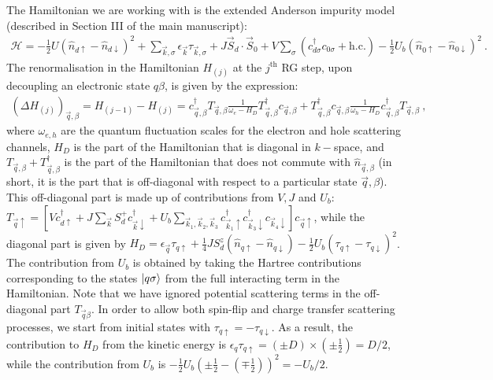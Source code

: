\documentclass{iopart}
\begin{document}
The Hamiltonian we are working with is the extended Anderson impurity model (described in Section III of the main manuscript):
\begin{eqnarray}
	\mathcal{H} = -\frac{1}{2}U \left(\hat n_{d \uparrow} - \hat n_{d \downarrow}\right)^2 + \sum_{\vec k,\sigma} \epsilon_{\vec k} \tau_{\vec k,\sigma} + J \vec{S}_d\cdot\vec{S}_0 + V\sum_\sigma \left( c^\dagger_{d\sigma}c_{0\sigma} + \text{h.c.}\right) - \frac{1}{2}U_b \left(\hat n_{0 \uparrow} - \hat n_{0 \downarrow}\right)^2~.\quad
\end{eqnarray}
The renormalisation in the Hamiltonian \(H_{(j)}\) at the \(j^\text{th}\) RG step, upon decoupling an electronic state \(q\beta\), is given by the expression:
\begin{eqnarray}
	\left(\Delta H_{(j)}\right)_{\vec q,\beta} = H_{(j-1)} - H_{(j)} = c^\dagger_{\vec q,\beta} T_{\vec q,\beta} \frac{1}{\omega_e - H_D} T^\dagger_{\vec q,\beta}c_{\vec q,\beta} + T^\dagger_{\vec q,\beta} c_{\vec q,\beta} \frac{1}{\omega_h - H_D} c^\dagger_{\vec q,\beta}T_{\vec q,\beta}~,
\end{eqnarray}
where \(\omega_{e,h}\) are the quantum fluctuation scales for the electron and hole scattering channels, \(H_D\) is the part of the Hamiltonian that is diagonal in \(k-\)space, and \(T_{\vec q,\beta} + T_{\vec q,\beta}^\dagger\) is the part of the Hamiltonian that does not commute with \(\hat n_{\vec q,\beta}\) (in short, it is the part that is off-diagonal with respect to a particular state \(\vec q,\beta\)). This off-diagonal part is made up of contributions from \(V,J\) and \(U_b\): \(T_{\vec q \uparrow} = \left[V c^\dagger_{d \uparrow}  + J \sum_{\vec k}S_d^+ c^\dagger_{\vec k \downarrow}  + U_b \sum_{\vec k_1,\vec k_2,\vec k_3}c^\dagger_{\vec k_1 \uparrow} c^\dagger_{\vec k_3 \downarrow} c_{\vec k_4 \downarrow}\right] c_{\vec q \uparrow}\),
while the diagonal part is given by \(H_D = \epsilon_{\vec q} \tau_{q\uparrow} + \frac{1}{4}J S_d^z\left(\hat n_{q \uparrow} - \hat n_{q \downarrow}\right) - \frac{1}{2}U_b \left(\tau_{q \uparrow} - \tau_{q \downarrow}\right)^2\). The contribution from \(U_b\) is obtained by taking the Hartree contributions corresponding to the states \(\ket{q\sigma}\) from the full interacting term in the Hamiltonian.
Note that we have ignored potential scattering terms in the off-diagonal part \(T_{\vec q\beta}\). In order to allow both spin-flip and charge transfer scattering processes, we start from initial states with \(\tau_{q \uparrow} = -\tau_{q \downarrow}\). As a result, the contribution to \(H_D\) from the kinetic energy is \(\epsilon_q \tau_{q \uparrow} = \left(\pm D\right)\times\left(\pm\frac{1}{2}\right) = D/2\), while the contribution from \(U_b\) is \(-\frac{1}{2}U_b\left(\pm\frac{1}{2} - \left( \mp\frac{1}{2} \right) \right)^2 = -U_b/2 \).
\end{document}

